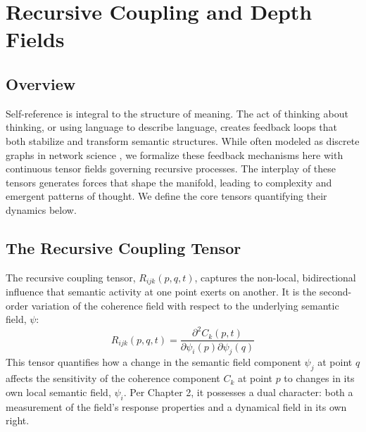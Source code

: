 \chapter{Recursive Coupling and Depth Fields}\label{ch:recursive_coupling_and_depth_fields}


\section{Overview}

Self-reference is integral to the structure of meaning. The act of thinking about thinking, or using language to describe language, creates feedback loops that both stabilize and transform semantic structures. While often modeled as discrete graphs in network science \autocite{Barabasi2016}, we formalize these feedback mechanisms here with continuous tensor fields governing recursive processes. The interplay of these tensors generates forces that shape the manifold, leading to complexity and emergent patterns of thought. We define the core tensors quantifying their dynamics below.


\section{The Recursive Coupling Tensor}\label{sec:the_recursive_coupling_tensor}

The recursive coupling tensor, \(R_{ijk}(p, q, t)\), captures the non-local, bidirectional influence that semantic activity at one point exerts on another. It is the second-order variation of the coherence field with respect to the underlying semantic field, \(\psi\):
\begin{equation}
R_{ijk}(p, q, t) = \frac{\partial^2 C_k(p,t)}{\partial \psi_i(p) \partial \psi_j(q)}
\end{equation}
This tensor quantifies how a change in the semantic field component \(\psi_j\) at point \(q\) affects the sensitivity of the coherence component \(C_k\) at point \(p\) to changes in its own local semantic field, \(\psi_i\). Per Chapter 2, it possesses a dual character: both a measurement of the field's response properties and a dynamical field in its own right.


